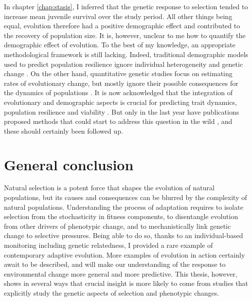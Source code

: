 In chapter \ref{chap:stasis}, I inferred that the genetic response to selection tended to increase mean juvenile survival over the study period. All other things being equal, evolution therefore had a positive demographic effect and contributed to the recovery of population size. It is, however, unclear to me how to quantify the demographic effect of evolution. To the best of my knowledge, an appropriate methodological framework is still lacking. 
Indeed, traditional demographic models used to predict population resilience ignore individual heterogeneity and genetic change \parencite{Kendall2011, vindenes2015, Plard2016}. On the other hand, quantitative genetic studies focus on estimating rates of evolutionary change, but mostly ignore their possible consequences for the dynamics of populations \parencite{Coulson2010,Chevin2012}.
It is now acknowledged that the integration of evolutionary and demographic aspects is crucial for predicting trait dynamics, population resilience and viability \parencite{Schoener2011,Pelletier2012,Chevin2012,Merila2014}. But only in the last year have publications proposed methods that could start to address this question in the wild \parencite{vindenes2015, Coulson2015, Childs2016}, and these should certainly been followed up. 

\section{General conclusion}
Natural selection is a potent force that shapes the evolution of natural populations, but its causes and consequences can be blurred by the complexity of natural populations.
Understanding the process of adaptation requires to isolate selection from the stochasticity in fitness components, to disentangle evolution from other drivers of phenotypic change, and to mechanistically link genetic change to selective pressures.
Being able to do so, thanks to an individual-based monitoring including genetic relatedness, I provided a rare example of contemporary adaptive evolution. More examples of evolution in action certainly await to be described, and will make our understanding of the response to environmental change more general and more predictive. This thesis, however, shows in several ways that crucial insight is more likely to come from studies that explicitly study the genetic aspects of selection and phenotypic changes.


\printbibliography[heading=subbibliography]

